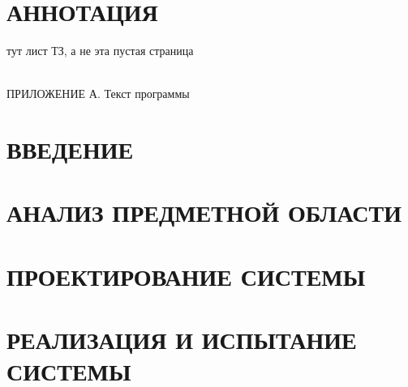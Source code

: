 

\newpage
\section*{АННОТАЦИЯ}


\newpage
тут лист ТЗ, а не эта пустая страница

\newpage
{}
\tableofcontents
\hspace{0pt}\\
ПРИЛОЖЕНИЕ А. Текст программы

\newpage
{}
{}
\section*{ВВЕДЕНИЕ}


\section{АНАЛИЗ ПРЕДМЕТНОЙ ОБЛАСТИ}


\newpage
\section{ПРОЕКТИРОВАНИЕ СИСТЕМЫ}



% 
% 



\newpage
\section{РЕАЛИЗАЦИЯ И ИСПЫТАНИЕ СИСТЕМЫ}
% 



